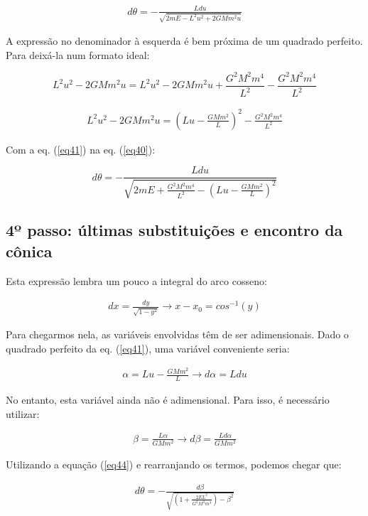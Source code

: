 \begin{eqnarray}
	d\theta = -\frac{Ldu}{\sqrt{2mE -  L^2u^2 + 2GMm^2u}} \label{eq40}
\end{eqnarray}

A expressão no denominador à esquerda é bem próxima de um quadrado perfeito. Para deixá-la num formato ideal:

\[
	L^2u^2 - 2GMm^2u = L^2u^2 - 2GMm^2u + \frac{G^2M^2m^4}{L^2} - \frac{G^2M^2m^4}{L^2}
\]

\begin{eqnarray}
	L^2u^2 - 2GMm^2u = \left(Lu - \frac{GMm^2}{L}\right)^2 - \frac{G^2M^2m^4}{L^2} \label{eq41}
\end{eqnarray}

Com a eq. (\ref{eq41}) na eq. (\ref{eq40}):

\[
	d\theta = -\frac{Ldu}{\sqrt{2mE + \frac{G^2M^2m^4}{L^2} - \left(Lu - \frac{GMm^2}{L}\right)^2}}
\]

\subsection{4º passo: últimas substituições e encontro da cônica}

Esta expressão lembra um pouco a integral do arco cosseno:

\begin{eqnarray}
	dx = \frac{dy}{\sqrt{1-y^2}}\rightarrow x- x_0 = cos^{-1}(y) \label{eq42}
\end{eqnarray}

Para chegarmos nela, as variáveis envolvidas têm de ser adimensionais. Dado o quadrado perfeito da eq.  (\ref{eq41}), uma variável conveniente seria:

\begin{eqnarray}
	\alpha = Lu - \frac{GMm^2}{L}  \rightarrow d\alpha = Ldu \label{eq43}
\end{eqnarray}

No entanto, esta variável ainda não é adimensional. Para isso, é necessário utilizar:

\begin{eqnarray}
	\beta = \frac{L\alpha}{GMm^2} \rightarrow d\beta = \frac{Ld\alpha}{GMm^2} \label{eq44}
\end{eqnarray}

Utilizando a equação (\ref{eq44}) e rearranjando os termos, podemos chegar que:

\begin{eqnarray}
	d\theta = -\frac{d\beta}{\sqrt{\left(1 + \frac{2EL^2}{G^2M^2m^3}\right) - \beta^2}} \label{eq45}
\end{eqnarray}

